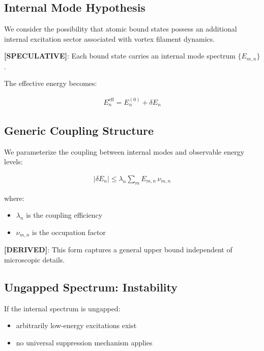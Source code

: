 \documentclass[11pt]{article}
\theoremstyle{definition}
\theoremstyle{plain}
\theoremstyle{remark}
\begin{document}
    \subsection{Internal Mode Hypothesis}
        
        We consider the possibility that atomic bound states possess an additional internal excitation sector associated with vortex filament dynamics.
        
        \textbf{[SPECULATIVE]}:
        Each bound state carries an internal mode spectrum $\{E_{m,n}\}$.
        
        The effective energy becomes:
        
        \begin{align}
            E_n^{\text{eff}} = E_n^{(0)} + \delta E_n
            \label{eq:effective_energy}
        \end{align}
    
    \subsection{Generic Coupling Structure}
        
        We parameterize the coupling between internal modes and observable energy levels:
        
        \begin{align}
            |\delta E_n| \leq \lambda_n \sum_m E_{m,n} \, \nu_{m,n}
            \label{eq:coupling_bound}
        \end{align}
        
        where:
        \begin{itemize}
            \item $\lambda_n$ is the coupling efficiency
            \item $\nu_{m,n}$ is the occupation factor
        \end{itemize}
        
        \textbf{[DERIVED]}: This form captures a general upper bound independent of microscopic details.
    
    \subsection{Ungapped Spectrum: Instability}
        
        If the internal spectrum is ungapped:
        
        \begin{itemize}
            \item arbitrarily low-energy excitations exist
            \item no universal suppression mechanism applies
        \end{itemize}
        
\end{document}
